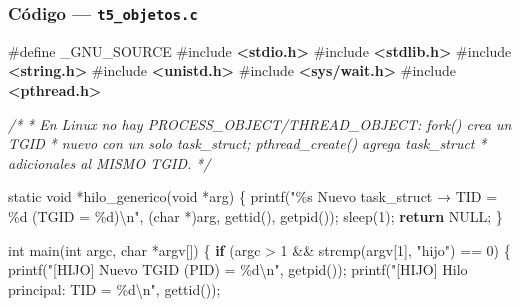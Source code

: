 \documentclass[
  spanish,
]{article}
\newenvironment{Shaded}{}{}
\newcommand{\CommentTok}[1]{\textcolor[rgb]{0.38,0.63,0.69}{\textit{#1}}}
\newcommand{\ControlFlowTok}[1]{\textcolor[rgb]{0.00,0.44,0.13}{\textbf{#1}}}
\newcommand{\DataTypeTok}[1]{\textcolor[rgb]{0.56,0.13,0.00}{#1}}
\newcommand{\DecValTok}[1]{\textcolor[rgb]{0.25,0.63,0.44}{#1}}
\newcommand{\ImportTok}[1]{\textcolor[rgb]{0.00,0.50,0.00}{\textbf{#1}}}
\newcommand{\NormalTok}[1]{#1}
\newcommand{\OperatorTok}[1]{\textcolor[rgb]{0.40,0.40,0.40}{#1}}
\newcommand{\OtherTok}[1]{\textcolor[rgb]{0.00,0.44,0.13}{#1}}
\newcommand{\PreprocessorTok}[1]{\textcolor[rgb]{0.74,0.48,0.00}{#1}}
\newcommand{\SpecialCharTok}[1]{\textcolor[rgb]{0.25,0.44,0.63}{#1}}
\newcommand{\StringTok}[1]{\textcolor[rgb]{0.25,0.44,0.63}{#1}}
\begin{document}
\subsubsection{\texorpdfstring{Código ---
\texttt{t5\_objetos.c}}{Código --- t5\_objetos.c}}\label{cuxf3digo-t5_objetos.c}

\begin{Shaded}
\begin{Highlighting}[]
\PreprocessorTok{\#define }\OtherTok{\_GNU\_SOURCE}
\PreprocessorTok{\#include }\ImportTok{\textless{}stdio.h\textgreater{}}
\PreprocessorTok{\#include }\ImportTok{\textless{}stdlib.h\textgreater{}}
\PreprocessorTok{\#include }\ImportTok{\textless{}string.h\textgreater{}}
\PreprocessorTok{\#include }\ImportTok{\textless{}unistd.h\textgreater{}}
\PreprocessorTok{\#include }\ImportTok{\textless{}sys/wait.h\textgreater{}}
\PreprocessorTok{\#include }\ImportTok{\textless{}pthread.h\textgreater{}}

\CommentTok{/*}
\CommentTok{ * En Linux no hay PROCESS\_OBJECT/THREAD\_OBJECT: fork() crea un TGID}
\CommentTok{ * nuevo con un solo task\_struct; pthread\_create() agrega task\_struct}
\CommentTok{ * adicionales al MISMO TGID.}
\CommentTok{ */}

\DataTypeTok{static} \DataTypeTok{void} \OperatorTok{*}\NormalTok{hilo\_generico}\OperatorTok{(}\DataTypeTok{void} \OperatorTok{*}\NormalTok{arg}\OperatorTok{)} \OperatorTok{\{}
\NormalTok{    printf}\OperatorTok{(}\StringTok{"}\SpecialCharTok{\%s}\StringTok{  Nuevo task\_struct → TID = }\SpecialCharTok{\%d}\StringTok{  (TGID = }\SpecialCharTok{\%d}\StringTok{)}\SpecialCharTok{\textbackslash{}n}\StringTok{"}\OperatorTok{,}
           \OperatorTok{(}\DataTypeTok{char} \OperatorTok{*)}\NormalTok{arg}\OperatorTok{,}\NormalTok{ gettid}\OperatorTok{(),}\NormalTok{ getpid}\OperatorTok{());}
\NormalTok{    sleep}\OperatorTok{(}\DecValTok{1}\OperatorTok{);}
    \ControlFlowTok{return}\NormalTok{ NULL}\OperatorTok{;}
\OperatorTok{\}}

\DataTypeTok{int}\NormalTok{ main}\OperatorTok{(}\DataTypeTok{int}\NormalTok{ argc}\OperatorTok{,} \DataTypeTok{char} \OperatorTok{*}\NormalTok{argv}\OperatorTok{[])} \OperatorTok{\{}
    \ControlFlowTok{if} \OperatorTok{(}\NormalTok{argc }\OperatorTok{\textgreater{}} \DecValTok{1} \OperatorTok{\&\&}\NormalTok{ strcmp}\OperatorTok{(}\NormalTok{argv}\OperatorTok{[}\DecValTok{1}\OperatorTok{],} \StringTok{"hijo"}\OperatorTok{)} \OperatorTok{==} \DecValTok{0}\OperatorTok{)} \OperatorTok{\{}
\NormalTok{        printf}\OperatorTok{(}\StringTok{"[HIJO]  Nuevo TGID (PID) = }\SpecialCharTok{\%d\textbackslash{}n}\StringTok{"}\OperatorTok{,}\NormalTok{ getpid}\OperatorTok{());}
\NormalTok{        printf}\OperatorTok{(}\StringTok{"[HIJO]  Hilo principal: TID = }\SpecialCharTok{\%d\textbackslash{}n}\StringTok{"}\OperatorTok{,}\NormalTok{ gettid}\OperatorTok{());}


\end{Highlighting}
\end{Shaded}
\end{document}
